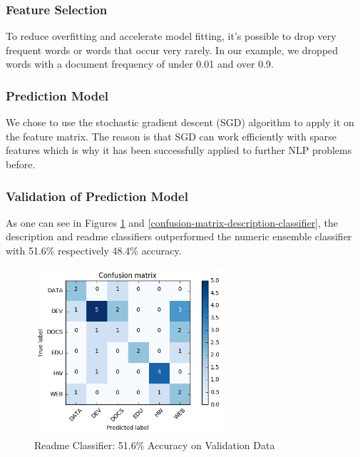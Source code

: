 \documentclass[%
a4paper,
DIV12,
2.5headlines,
bigheadings,
titlepage,
openbib,
]{scrartcl}
\begin{document}
\subsubsection{Feature Selection}\label{feature-selection-1}

To reduce overfitting and accelerate model fitting, it's possible to drop very frequent words or words that occur very rarely.
In our example, we dropped words with a document frequency of under 0.01 and over 0.9.

\subsubsection{Prediction Model}\label{prediction-model-1}

We chose to use the stochastic gradient descent (SGD) algorithm to apply it on the feature matrix.
The reason is that SGD can work efficiently with sparse features which is why it has been successfully applied to further NLP problems before.

\subsubsection{Validation of Prediction Model}\label{validation-of-prediction-model-1}

As one can see in Figures \ref{confusion-matrix-readme-classifier} and \ref{confusion-matrix-description-classifier}, the description and readme classifiers outperformed the numeric ensemble classifier with 51.6\% respectively 48.4\% accuracy.
\begin{figure}[H]
	\centering
		\includegraphics[width=7cm]{graphics/confusion-matrix-readme-classifier.png}
	\caption{Readme Classifier: 51.6\% Accuracy on Validation Data}
	\label{confusion-matrix-readme-classifier}
\end{figure}
\end{document}
